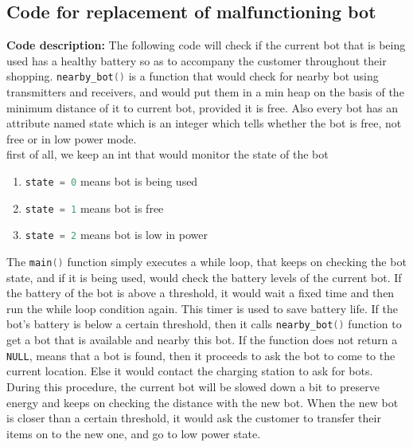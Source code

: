 \documentclass{article}
\begin{document}
\subsection{Code for replacement of malfunctioning bot}
\label{code:b}
\textbf{Code description: } The following code will check if the current bot that is being used has a healthy battery so as to accompany the customer throughout their shopping. \lstinline[language=C++]{nearby_bot()} is a function that would check for nearby bot using transmitters and receivers, and would put them in a min heap on the basis of the minimum distance of it to current bot, provided it is free. Also every bot has an attribute named state which is an integer which tells whether the bot is free, not free or in low power mode.
\\
first of all, we keep an int that would monitor the state of the bot
\begin{enumerate}
    \item \lstinline[language=C++]{state = 0} means bot is being used
    \item \lstinline[language=C++]{state = 1} means bot is free
    \item \lstinline[language=C++]{state = 2} means bot is low in power
\end{enumerate}
The \lstinline[language=C++]{main()} function simply executes a while loop, that keeps on checking the bot state, and if it is being used, would check the battery levels of the current bot. If the battery of the bot is above a threshold, it would wait a fixed time and then run the while loop condition again. This timer is used to save battery life. If the bot's battery is below a certain threshold, then it calls \lstinline[language=C++]{nearby_bot()} function to get a bot that is available and nearby this bot. If the function does not return a \lstinline[language=C++]{NULL}, means that a bot is found, then it proceeds to ask the bot to come to the current location. Else it would contact the charging station to ask for bots. During this procedure, the current bot will be slowed down a bit to preserve energy and keeps on checking the distance with the new bot. When the new bot is closer than a certain threshold, it would ask the customer to transfer their items on to the new one, and go to low power state.
\end{document}
